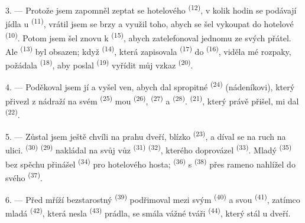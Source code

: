 3. --- Protože jsem zapomněl zeptat se hotelového  \textsuperscript{(12)}, v
kolik hodin se podávají jídla u  \textsuperscript{(11)}, vrátil jsem
se brzy a využil toho, abych se šel vykoupat do hotelové 
\textsuperscript{(10)}. Potom jsem šel znovu k
 \textsuperscript{(15)}, abych zatelefonoval jednomu ze svých přátel.
Ale  \textsuperscript{(13)} byl obsazen; když 
\textsuperscript{(14)}, která zapisovala  \textsuperscript{(17)} do
 \textsuperscript{(16)}, viděla mé rozpaky, požádala
 \textsuperscript{(18)}, aby poslal 
\textsuperscript{(19)} vyřídit můj vzkaz  \textsuperscript{(20)}.

4. --- Poděkoval jsem jí a vyšel ven, abych dal spropitné 
\textsuperscript{(24)} (nádeníkovi), který přivezl z nádraží na svém 
\textsuperscript{(25)} mou  \textsuperscript{(26)},
 \textsuperscript{(27)} a 
\textsuperscript{(28)}.  \textsuperscript{(21)}, který právě přišel, mi dal
 \textsuperscript{(22)}.

5. --- Zůstal jsem ještě chvíli na prahu dveří, blízko 
\textsuperscript{(23)}, a díval se na ruch na ulici.  \textsuperscript{(30)}
 \textsuperscript{(29)} nakládal na svůj vůz
 \textsuperscript{(31)}  \textsuperscript{(32)},
kterého doprovázel  \textsuperscript{(33)}. Mladý
 \textsuperscript{(35)} bez spěchu přinášel 
\textsuperscript{(34)} pro hotelového hosta;  \textsuperscript{(36)} s
 \textsuperscript{(38)} přes rameno nahlížel do svého
 \textsuperscript{(37)}.

\VUsaut{4.0mm}
\VUsaut{3.0mm}

6. --- Před mříží bezstarostný  \textsuperscript{(39)} podřimoval mezi svým
 \textsuperscript{(40)} a svou 
\textsuperscript{(41)}, zatímco mladá  \textsuperscript{(42)}, která nesla
 \textsuperscript{(43)} prádla, se smála vážné tváři
 \textsuperscript{(44)}, který stál u dveří.


